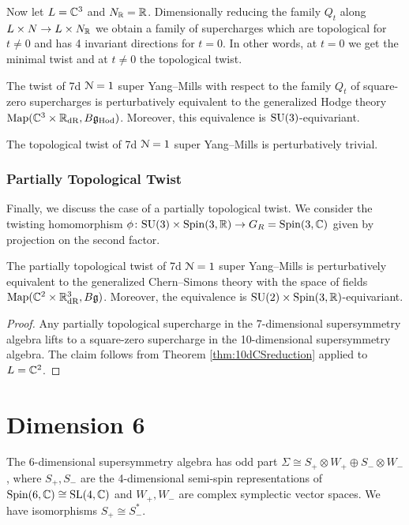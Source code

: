 \documentclass[10pt, oneside]{article}
\newcommand{\Hod}{\mathrm{Hod}}
\begin{document}
Now let $L=\mathbb C^3$ and $N_\mathbb R=\mathbb R$. Dimensionally reducing the family $Q_t$ along $L\times N\rightarrow L\times N_\mathbb R$ we obtain a family of supercharges which are topological for $t\neq 0$ and has 4 invariant directions for $t=0$. In other words, at $t=0$ we get the minimal twist and at $t\neq 0$ the topological twist.

\begin{theorem}
The twist of 7d $\mathcal N=1$ super Yang--Mills with respect to the family $Q_t$ of square-zero supercharges is perturbatively equivalent to the generalized Hodge theory $\map(\CC^3\times \RR_{\mr{dR}}, B\fg_{\Hod})$. Moreover, this equivalence is $\mathrm{SU}(3)$-equivariant.
\label{thm:7dHodgetwist}
\end{theorem}

\begin{corollary}
The topological twist of 7d $\mathcal N=1$ super Yang--Mills is perturbatively trivial.
\end{corollary}

\subsubsection{Partially Topological Twist}
\label{sect:7dpartialtwist}

Finally, we discuss the case of a partially topological twist. We consider the twisting homomorphism $\phi\colon \mathrm{SU}(3)\times \mathrm{Spin}(3, \mathbb R)\rightarrow G_R=\mathrm{Spin}(3, \mathbb C)$ given by projection on the second factor.

\begin{theorem}
The partially topological twist of 7d $\mathcal N=1$ super Yang--Mills is perturbatively equivalent to the generalized Chern--Simons theory with the space of fields $\operatorname{Map}(\mathbb C^2\times \mathbb R^3_{\mathrm{dR}}, B\mathfrak g)$. Moreover, the equivalence is $\mathrm{SU}(2)\times \mathrm{Spin}(3, \mathbb R)$-equivariant.
\label{thm:7dpartiallytopologicaltwist}
\end{theorem}
\begin{proof}
Any partially topological supercharge in the 7-dimensional supersymmetry algebra lifts to a square-zero supercharge in the 10-dimensional supersymmetry algebra. The claim follows from Theorem \ref{thm:10dCSreduction} applied to $L=\mathbb C^2$.
\end{proof}

\section{Dimension 6}

The 6-dimensional supersymmetry algebra has odd part $\Sigma\cong S_+\otimes W_+\oplus S_-\otimes W_-$, where $S_+, S_-$ are the 4-dimensional semi-spin representations of $\mathrm{Spin}(6, \mathbb C)\cong \mathrm{SL}(4, \mathbb C)$ and $W_+, W_-$ are complex symplectic vector spaces. We have isomorphisms $S_+\cong S_-^*$.
\end{document}

